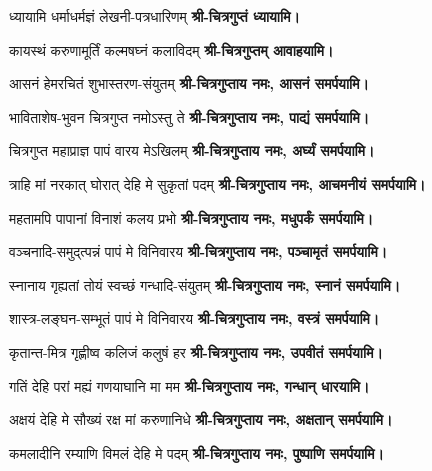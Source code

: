 

\renewcommand{\devAya}{श्री-चित्रगुप्ताय नमः,}
\begin{center}

{ध्यायामि धर्माधर्मज्ञं लेखनी-पत्रधारिणम्}
\textbf{श्री-चित्रगुप्तं ध्यायामि।}
\medskip

{कायस्थं करुणामूर्तिं कल्मषघ्नं कलाविदम्}
\textbf{श्री-चित्रगुप्तम् आवाहयामि।}
\medskip

{आसनं हेमरचितं शुभास्तरण-संयुतम्}
\textbf{\devAya{} आसनं समर्पयामि।}
\medskip

{भाविताशेष-भुवन चित्रगुप्त नमोऽस्तु ते}
\textbf{\devAya{} पाद्यं समर्पयामि।}
\medskip

{चित्रगुप्त महाप्राज्ञ पापं वारय मेऽखिलम्}
\textbf{\devAya{} अर्घ्यं समर्पयामि।}
\medskip

{त्राहि मां नरकात् घोरात् देहि मे सुकृतां पदम्}
\textbf{\devAya{} आचमनीयं समर्पयामि।}
\medskip

{महतामपि पापानां विनाशं कलय प्रभो}
\textbf{\devAya{} मधुपर्कं समर्पयामि।}
\medskip

{वञ्चनादि-समुद्त्पन्नं पापं मे विनिवारय}
\textbf{\devAya{} पञ्चामृतं समर्पयामि।}
\medskip

{स्नानाय गृह्यतां तोयं स्वच्छं गन्धादि-संयुतम्}
\textbf{\devAya{} स्नानं समर्पयामि।}
\medskip

{शास्त्र-लङ्घन-सम्भूतं पापं मे विनिवारय}
\textbf{\devAya{} वस्त्रं समर्पयामि।}
\medskip

{कृतान्त-मित्र गृह्णीष्व कलिजं कलुषं हर}
\textbf{\devAya{} उपवीतं समर्पयामि।}
\medskip

{गतिं देहि परां मह्यं गणयाघानि मा मम}
\textbf{\devAya{} गन्धान् धारयामि।}
\medskip

{अक्षयं देहि मे सौख्यं रक्ष मां करुणानिधे}
\textbf{\devAya{} अक्षतान् समर्पयामि।}
\medskip

{कमलादीनि रम्याणि विमलं देहि मे पदम्}
\textbf{\devAya{} पुष्पाणि समर्पयामि।}
\medskip

\end{center}

